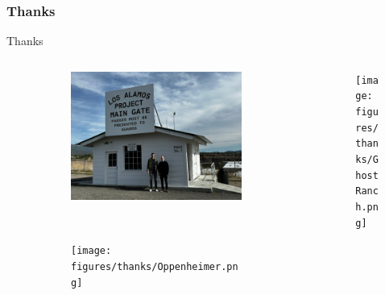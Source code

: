\documentclass[pt12]{beamer}
\begin{document}
\begin{frame}
\frametitle{Thanks}


Thanks

    \begin{columns}

        \begin{column}{0.50\textwidth}
\begin{figure}
     \centering
     \begin{subfigure}[b]{0.70\textwidth}
         \centering
         \includegraphics[width=\textwidth]{figures/thanks/LosAlamosMainGate.png}
     \end{subfigure}\\
     \begin{subfigure}[b]{0.70\textwidth}
         \centering
         \texttt{[image: figures/thanks/Oppenheimer.png]}
     \end{subfigure}
\end{figure}

        \end{column}
        \begin{column}{0.50\textwidth}

\begin{figure}
         \centering
         \texttt{[image: figures/thanks/GhostRanch.png]}
\end{figure}

        \end{column}
        
    \end{columns}


\end{frame}
\end{document}
